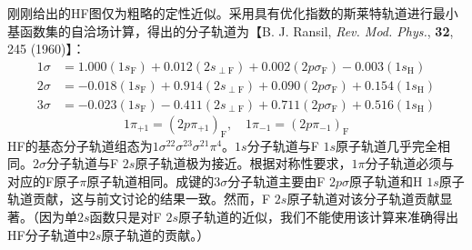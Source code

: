     刚刚给出的HF图仅为粗略的定性近似。采用具有优化指数的斯莱特轨道进行最小基函数集的自洽场计算，得出的分子轨道为【B. J. Ransil, \textit{Rev. Mod. Phys.}, \textbf{32}, 245 (1960)】：
    \begin{equation*}
        \begin{aligned}
            1\sigma &= 1.000 (1s_{\mathrm{F}}) + 0.012 (2s_{\perp \mathrm{F}}) + 0.002 (2p\sigma_{\mathrm{F}}) - 0.003 (1s_{\mathrm{H}}) \\
            2\sigma &= -0.018 (1s_{\mathrm{F}}) + 0.914 (2s_{\perp \mathrm{F}}) + 0.090 (2p\sigma_{\mathrm{F}}) + 0.154 (1s_{\mathrm{H}}) \\
            3\sigma &= -0.023(1s_{\mathrm{F}}) - 0.411(2s_{\perp \mathrm{F}}) + 0.711(2p\sigma_{\mathrm{F}}) + 0.516(1s_{\mathrm{H}})
        \end{aligned}
    \end{equation*}
    \begin{equation*}
        1\pi_{+1} = (2p\pi_{+1})_{\mathrm{F}}, \quad 1\pi_{-1} = (2p\pi_{-1})_{\mathrm{F}}
    \end{equation*}
    HF的基态分子轨道组态为$1\sigma^22\sigma^23\sigma^21\pi^4$。$1s$分子轨道与F $1s$原子轨道几乎完全相同。$2\sigma$分子轨道与F $2s$原子轨道极为接近。根据对称性要求，$1\pi$分子轨道必须与对应的F原子$\pi$原子轨道相同。成键的$3\sigma$分子轨道主要由F $2p\sigma$原子轨道和H $1s$原子轨道贡献，这与前文讨论的结果一致。然而，F $2s$原子轨道对该分子轨道贡献显著。（因为单$2s$函数只是对F $2s$原子轨道的近似，我们不能使用该计算来准确得出HF分子轨道中$2s$原子轨道的贡献。）

